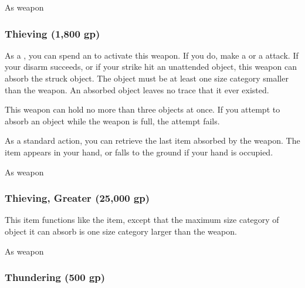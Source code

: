  


 As weapon


\lowercase{\hypertarget{item:Thieving}{}}\label{item:Thieving}
\hypertarget{item:Thieving}{\subsubsection{Thieving\hfill{} (1,800 gp)}}

As a , you can spend an  to activate this weapon.
If you do, make a  or a  attack.
If your disarm succeeds, or if your strike hit an unattended object, this weapon can absorb the struck object.
The object must be at least one size category smaller than the weapon.
An absorbed object leaves no trace that it ever existed.

This weapon can hold no more than three objects at once.
If you attempt to absorb an object while the weapon is full, the attempt fails.

As a standard action, you can retrieve the last item absorbed by the weapon.
The item appears in your hand, or falls to the ground if your hand is occupied.



 


 As weapon


\lowercase{\hypertarget{item:Thieving, Greater}{}}\label{item:Thieving, Greater}
\hypertarget{item:Thieving, Greater}{\subsubsection{Thieving, Greater\hfill{} (25,000 gp)}}

This item functions like the  item, except that the maximum size category of object it can absorb is one size category larger than the weapon.



 


 As weapon


\lowercase{\hypertarget{item:Thundering}{}}\label{item:Thundering}
\hypertarget{item:Thundering}{\subsubsection{Thundering\hfill{} (500 gp)}}


